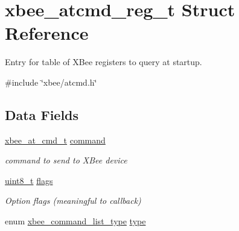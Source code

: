 \hypertarget{structxbee__atcmd__reg__t}{\section{xbee\-\_\-atcmd\-\_\-reg\-\_\-t Struct Reference}
\label{structxbee__atcmd__reg__t}
}


Entry for table of X\-Bee registers to query at startup.  




{\ttfamily \#include \char`\"{}xbee/atcmd.\-h\char`\"{}}

\subsection*{Data Fields}
\begin{DoxyCompactItemize}
\item 
\hypertarget{structxbee__atcmd__reg__t_aa1e66c60bb56acaced6ca2646fd44616}{\hyperlink{unionxbee__at__cmd__t}{xbee\-\_\-at\-\_\-cmd\-\_\-t} \hyperlink{structxbee__atcmd__reg__t_aa1e66c60bb56acaced6ca2646fd44616}{command}}\label{structxbee__atcmd__reg__t_aa1e66c60bb56acaced6ca2646fd44616}

\begin{DoxyCompactList}\small\item\em command to send to X\-Bee device \end{DoxyCompactList}\item 
\hypertarget{structxbee__atcmd__reg__t_aa2585d779da0ab21273a8d92de9a0ebe}{\hyperlink{group__hal_gae1affc9ca37cfb624959c866a73f83c2}{uint8\-\_\-t} \hyperlink{structxbee__atcmd__reg__t_aa2585d779da0ab21273a8d92de9a0ebe}{flags}}\label{structxbee__atcmd__reg__t_aa2585d779da0ab21273a8d92de9a0ebe}

\begin{DoxyCompactList}\small\item\em Option flags (meaningful to callback) \end{DoxyCompactList}\item 
\hypertarget{structxbee__atcmd__reg__t_a73e116f2bb2e10ad65a18894e74c224c}{enum \hyperlink{group__xbee__atcmd_ga1bd8ecd38c107579d20ded3c79a7d70b}{xbee\-\_\-command\-\_\-list\-\_\-type} \hyperlink{structxbee__atcmd__reg__t_a73e116f2bb2e10ad65a18894e74c224c}{type}}\label{structxbee__atcmd__reg__t_a73e116f2bb2e10ad65a18894e74c224c}


\end{DoxyCompactItemize}
